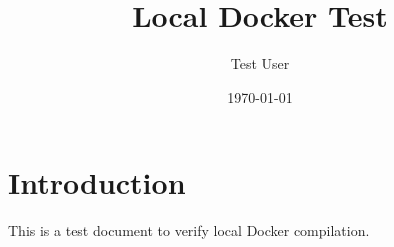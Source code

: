 \documentclass{article}
\begin{document}
\title{Local Docker Test}
\author{Test User}
\date{\today}
\maketitle

\section{Introduction}
This is a test document to verify local Docker compilation.
\end{document}
